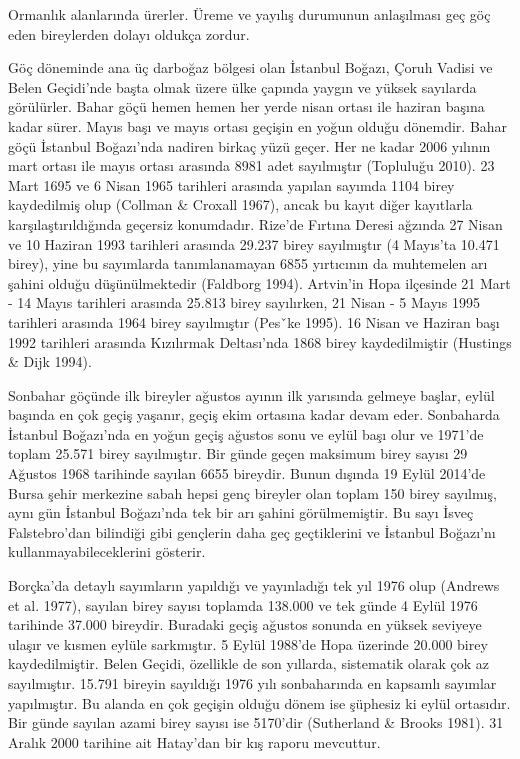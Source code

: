\documentclass[
  letterpaper,
  DIV=11,
  numbers=noendperiod]{scrreprt}
\begin{document}
Ormanlık alanlarında ürerler. Üreme ve yayılış durumunun anlaşılması geç
göç eden bireylerden dolayı oldukça zordur.

Göç döneminde ana üç darboğaz bölgesi olan İstanbul Boğazı, Çoruh Vadisi
ve Belen Geçidi'nde başta olmak üzere ülke çapında yaygın ve yüksek
sayılarda görülürler. Bahar göçü hemen hemen her yerde nisan ortası ile
haziran başına kadar sürer. Mayıs başı ve mayıs ortası geçişin en yoğun
olduğu dönemdir. Bahar göçü İstanbul Boğazı'nda nadiren birkaç yüzü
geçer. Her ne kadar 2006 yılının mart ortası ile mayıs ortası arasında
8981 adet sayılmıştır (Topluluğu 2010). 23 Mart 1695 ve 6 Nisan 1965
tarihleri arasında yapılan sayımda 1104 birey kaydedilmiş olup (Collman
\& Croxall 1967), ancak bu kayıt diğer kayıtlarla karşılaştırıldığında
geçersiz konumdadır. Rize'de Fırtına Deresi ağzında 27 Nisan ve 10
Haziran 1993 tarihleri arasında 29.237 birey sayılmıştır (4 Mayıs'ta
10.471 birey), yine bu sayımlarda tanımlanamayan 6855 yırtıcının da
muhtemelen arı şahini olduğu düşünülmektedir (Faldborg 1994). Artvin'in
Hopa ilçesinde 21 Mart - 14 Mayıs tarihleri arasında 25.813 birey
sayılırken, 21 Nisan - 5 Mayıs 1995 tarihleri arasında 1964 birey
sayılmıştır (Pesˇke 1995). 16 Nisan ve Haziran başı 1992 tarihleri
arasında Kızılırmak Deltası'nda 1868 birey kaydedilmiştir (Hustings \&
Dijk 1994).

Sonbahar göçünde ilk bireyler ağustos ayının ilk yarısında gelmeye
başlar, eylül başında en çok geçiş yaşanır, geçiş ekim ortasına kadar
devam eder. Sonbaharda İstanbul Boğazı'nda en yoğun geçiş ağustos sonu
ve eylül başı olur ve 1971'de toplam 25.571 birey sayılmıştır. Bir günde
geçen maksimum birey sayısı 29 Ağustos 1968 tarihinde sayılan 6655
bireydir. Bunun dışında 19 Eylül 2014'de Bursa şehir merkezine sabah
hepsi genç bireyler olan toplam 150 birey sayılmış, aynı gün İstanbul
Boğazı'nda tek bir arı şahini görülmemiştir. Bu sayı İsveç Falstebro'dan
bilindiği gibi gençlerin daha geç geçtiklerini ve İstanbul Boğazı'nı
kullanmayabileceklerini gösterir.

Borçka'da detaylı sayımların yapıldığı ve yayınladığı tek yıl 1976 olup
(Andrews et al. 1977), sayılan birey sayısı toplamda 138.000 ve tek
günde 4 Eylül 1976 tarihinde 37.000 bireydir. Buradaki geçiş ağustos
sonunda en yüksek seviyeye ulaşır ve kısmen eylüle sarkmıştır. 5 Eylül
1988'de Hopa üzerinde 20.000 birey kaydedilmiştir. Belen Geçidi,
özellikle de son yıllarda, sistematik olarak çok az sayılmıştır. 15.791
bireyin sayıldığı 1976 yılı sonbaharında en kapsamlı sayımlar
yapılmıştır. Bu alanda en çok geçişin olduğu dönem ise şüphesiz ki eylül
ortasıdır. Bir günde sayılan azami birey sayısı ise 5170'dir (Sutherland
\& Brooks 1981). 31 Aralık 2000 tarihine ait Hatay'dan bir kış raporu
mevcuttur.
\end{document}

